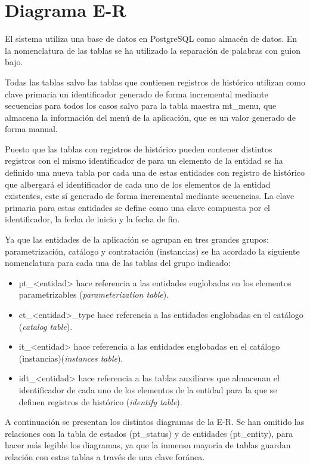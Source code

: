 \section{Diagrama E-R}
\label{sec:diagramaE-R}

El sistema utiliza una base de datos en PostgreSQL como almacén de datos.
En la nomenclatura de las tablas se ha utilizado la separación de palabras con guion bajo. 

Todas las tablas salvo las tablas que contienen registros de histórico utilizan como clave primaria un identificador generado de forma incremental mediante secuencias para todos los casos salvo para la tabla maestra  mt\_menu, que almacena la información del menú de la aplicación, que es un valor generado de forma manual.

Puesto que las tablas con registros de histórico pueden contener distintos registros con el mismo identificador de para un elemento de la entidad se ha definido una nueva tabla por cada una de estas entidades con registro de histórico que albergará el identificador de cada uno de los elementos de la entidad existentes, este sí generado de forma incremental mediante secuencias. La clave primaria para estas entidades se define como una clave compuesta por el identificador, la fecha de inicio y la fecha de fin.



Ya que las entidades de la aplicación se agrupan en tres grandes grupos: parametrización, catálogo y contratación (instancias) se ha acordado la siguiente nomenclatura para cada una de las tablas del grupo indicado:
\begin{itemize}
\item pt\_<entidad> hace referencia a las entidades englobadas en los elementos parametrizables (\textit{parameterization table}).
\item ct\_<entidad>\_type hace referencia a las entidades englobadas en el catálogo (\textit{catalog table}).
\item it\_<entidad> hace referencia a las entidades englobadas en el catálogo (instancias)(\textit{instances table}).
\item idt\_<entidad> hace referencia a las tablas auxiliares que almacenan el identificador de cada uno de los elementos de la entidad para la que se definen registros de histórico (\textit{identify table}).
\end{itemize}


A continuación se presentan los distintos diagramas de la E-R. Se han omitido las relaciones con la tabla de estados (pt\_status) y de entidades (pt\_entity), para hacer más legible los diagramas, ya que la inmensa mayoría de tablas guardan relación con estas tablas a través de una clave foránea.

